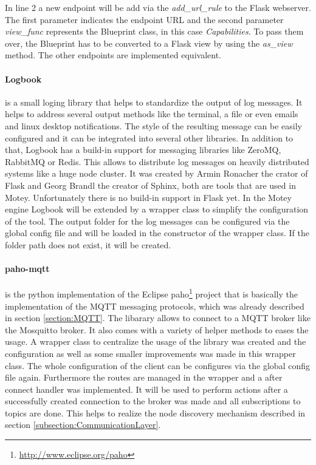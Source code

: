 In line 2 a new endpoint will be add via the \textit{add\_url\_rule} to the Flask webserver.
The first parameter indicates the endpoint \ac{URL} and the second parameter \textit{view\_func} represents the Blueprint class, in this case \textit{Capabilities}.
To pass them over, the Blueprint has to be converted to a Flask view by using the \textit{as\_view} method.
The other endpoints are implemented equivalent.

\paragraph{Logbook} is a small loging library that helps to standardize the output of log messages.
It helps to address several output methods like the terminal, a file or even emails and linux desktop notifications.
The style of the resulting message can be easily configured and it can be integrated into several other libraries.
In addition to that, Logbook has a build-in support for messaging libraries like ZeroMQ, RabbitMQ or Redis.
This allows to distribute log messages on heavily distributed systems like a huge node cluster.
It was created by Armin Ronacher the crator of Flask and Georg Brandl the creator of Sphinx, both are tools that are used in Motey.
Unfortunately there is no build-in support in Flask yet.
In the Motey engine Logbook will be extended by a wrapper class to simplify the configuration of the tool.
The output folder for the log messages can be configured via the global config file and will be loaded in the constructor of the wrapper class.
If the folder path does not exist, it will be created.

\paragraph{paho-mqtt} is the python implementation of the Eclipse paho\footnote{\url{http://www.eclipse.org/paho}} project that is basically the implementation of the \ac{MQTT} messaging protocols, which was already described in section \ref{section:MQTT}.
The libarary allows to connect to a \ac{MQTT} broker like the Mosquitto broker.
It also comes with a variety of helper methods to eases the usage.
A wrapper class to centralize the usage of the library was created and the configuration as well as some smaller improvements was made in this wrapper class.
The whole configuration of the client can be configures via the global config file again.
Furthermore the routes are managed in the wrapper and a after connect handler was implemented.
It will be used to perform actions after a successfully created connection to the broker was made and all subscriptions to topics are done.
This helps to realize the node discovery mechanism described in section \ref{subsection:CommunicationLayer}.

